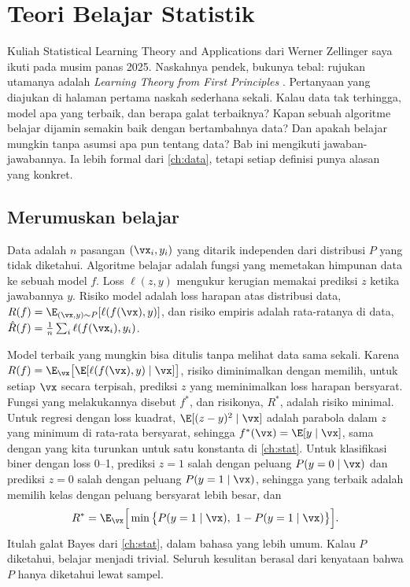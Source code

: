 \chapter{Teori Belajar Statistik}
\label{ch:teori}

Kuliah Statistical Learning Theory and Applications dari Werner Zellinger saya ikuti pada musim panas 2025. Naskahnya pendek,
bukunya tebal: rujukan utamanya adalah \emph{Learning Theory from First Principles} \citep{bach2024}. Pertanyaan yang diajukan
di halaman pertama naskah sederhana sekali. Kalau data tak terhingga, model apa yang terbaik, dan berapa galat terbaiknya?
Kapan sebuah algoritme belajar dijamin semakin baik dengan bertambahnya data? Dan apakah belajar mungkin tanpa asumsi apa pun
tentang data? Bab ini mengikuti jawaban-jawabannya. Ia lebih formal dari \cref{ch:data}, tetapi setiap definisi punya alasan
yang konkret.

\section{Merumuskan belajar}

Data adalah $n$ pasangan $(\vx_i,y_i)$ yang ditarik independen dari distribusi $P$ yang tidak diketahui. Algoritme belajar adalah
fungsi yang memetakan himpunan data ke sebuah model $f$. Loss $\ell(z,y)$ mengukur kerugian memakai prediksi $z$ ketika jawabannya
$y$. Risiko model adalah loss harapan atas distribusi data, $R(f)=\E_{(\vx,y)\sim P}[\ell(f(\vx),y)]$, dan risiko empiris adalah rata-ratanya
di data, $\hat R(f)=\tfrac1n\sum_i\ell(f(\vx_i),y_i)$.

Model terbaik yang mungkin bisa ditulis tanpa melihat data sama sekali. Karena $R(f)=\E_{\vx}\big[\E[\ell(f(\vx),y)\mid\vx]\big]$, risiko
diminimalkan dengan memilih, untuk setiap $\vx$ secara terpisah, prediksi $z$ yang meminimalkan loss harapan bersyarat. Fungsi
yang melakukannya disebut  $f^*$, dan risikonya, $R^*$, adalah risiko minimal. Untuk regresi dengan loss
kuadrat, $\E[(z-y)^2\mid\vx]$ adalah parabola dalam $z$ yang minimum di rata-rata bersyarat, sehingga $f^*(\vx)=\E[y\mid\vx]$, sama dengan
yang kita turunkan untuk satu konstanta di \cref{ch:stat}. Untuk klasifikasi biner dengan loss 0--1, prediksi $z=1$ salah dengan
peluang $P(y=0\mid\vx)$ dan prediksi $z=0$ salah dengan peluang $P(y=1\mid\vx)$, sehingga yang terbaik adalah memilih kelas dengan
peluang bersyarat lebih besar, dan
\begin{equation}
R^*=\E_{\vx}\Big[\min\big\{P(y=1\mid\vx),\ 1-P(y=1\mid\vx)\big\}\Big].
\end{equation}
Itulah galat Bayes dari \cref{ch:stat}, dalam bahasa yang lebih umum. Kalau $P$ diketahui, belajar menjadi trivial. Seluruh
kesulitan berasal dari kenyataan bahwa $P$ hanya diketahui lewat sampel.

